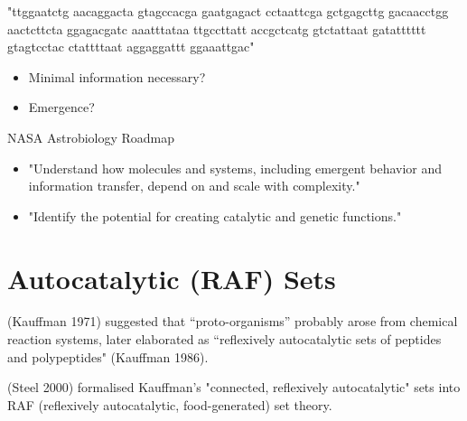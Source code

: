 \documentclass{beamer}
\begin{document}

\begin{frame}
\vspace{7mm}
"ttggaatctg aacaggacta gtagccacga gaatgagact cctaattcga gctgagcttg
gacaacctgg aactcttcta ggagacgatc aaatttataa ttgccttatt accgctcatg
gtctattaat gatatttttt gtagtcctac ctattttaat aggaggattt ggaaattgac"

\vspace{3mm}
\begin{itemize}
\item Minimal information necessary?
\item Emergence?
\end{itemize}
\end{frame}


\begin{frame}
NASA Astrobiology Roadmap

\begin{itemize}
\item  "Understand how molecules and systems, including emergent behavior and information transfer, depend on and scale with complexity."
\item "Identify the potential for creating catalytic and genetic functions."
\end{itemize}
\end{frame}

\section{Autocatalytic (RAF) Sets}

\begin{frame}
(Kauffman 1971) suggested that ``proto-organisms'' probably arose from chemical reaction systems, 
later elaborated as ``reflexively autocatalytic sets of peptides and polypeptides" (Kauffman 1986).

\vspace{5mm}
(Steel 2000) formalised Kauffman's "connected, reflexively autocatalytic" sets into RAF (reflexively autocatalytic, food-generated) set theory.
\end{frame}
\end{document}
